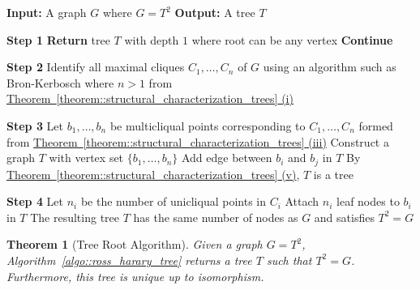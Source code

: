 \documentclass[11pt]{report}
\newtheorem{theorem}{Theorem}
\begin{document}
\begin{algorithm} \caption{Ross-Harary Tree Construction}  \label{algo::ross_harary_tree} 
  \begin{algorithmic}[1] 
    \State \textbf{Input:} A graph $G$ where $G = T^2$
    \State \textbf{Output:} A tree $T$
    \vspace{0.5em}

    \Statex \textbf{Step 1}
        \State \textbf{Return} tree $T$ with depth $1$ where root can be any vertex
    \Else
        \State \textbf{Continue} 
    \EndIf
    \vspace{0.5em}

    \Statex \textbf{Step 2}
    \State Identify all maximal cliques $C_1, \dots, C_n$ of $G$ using an algorithm such as Bron-Kerbosch \cite{bron_kerbosch_1973_maximal_cliques} where $n > 1$ from \hyperref[characterization::1]{Theorem~\ref{theorem::structural_characterization_trees} (i)}
    \vspace{0.5em}

    \Statex \textbf{Step 3}
    \State Let $b_1, \dots, b_n$ be multicliqual points corresponding to $C_1, \dots, C_n$ formed from 
    \hyperref[characterization::3]{Theorem~\ref{theorem::structural_characterization_trees}  (iii)} 
    \State Construct a graph $T$ with vertex set $\{b_1, \dots, b_n\}$
        \State Add edge between $b_i$ and $b_j$ in $T$
    \EndFor
    \State By \hyperref[characterization::5]{Theorem~\ref{theorem::structural_characterization_trees}  (v)}, $T$ is a tree

    \vspace{0.5em}
    \Statex \textbf{Step 4}
        \State Let $n_i$ be the number of unicliqual points in $C_i$
        \State Attach $n_i$ leaf nodes to $b_i$ in $T$
    \EndFor
    \State The resulting tree $T$ has the same number of nodes as $G$ and satisfies $T^2 = G$
  \end{algorithmic} 
\end{algorithm}

\begin{theorem}[Tree Root Algorithm] \label{theorem::tree_root_algorithm}
  Given a graph $G = T^2$, Algorithm~\eqref{algo::ross_harary_tree} returns a tree $T$ such that $T^2=G$. Furthermore, this tree is unique up to isomorphism.
\end{theorem}
\end{document}
